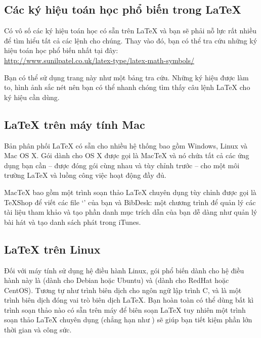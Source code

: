 \subsection{Các ký hiệu toán học phổ biến trong \LaTeX{}}

Có vô số các ký hiệu toán học có sẵn trên \LaTeX{} và bạn sẽ phải nỗ lực rất nhiều để tìm hiểu tất cả các lệnh cho chúng. Thay vào đó, bạn có thể tra cứu những ký hiệu toán học phổ biến nhất tại đây:\\
\url{http://www.sunilpatel.co.uk/latex-type/latex-math-symbols/}

Bạn có thể sử dụng trang này như một bảng tra cứu. Những ký hiệu được làm to, hình ảnh sắc nét nên bạn có thể nhanh chóng tìm thấy câu lệnh \LaTeX{} cho ký hiệu cần dùng.


\subsection{\LaTeX{} trên máy tính Mac}

Bản phân phối \LaTeX{} có sẵn cho nhiều hệ thống bao gồm Windows, Linux và Mac OS X. Gói dành cho OS X được gọi là MacTeX và nó chứa tất cả các ứng dụng bạn cần -- được đóng gói cùng nhau và tùy chỉnh trước -- cho một môi trường \LaTeX{} và luồng công việc hoạt động đầy đủ.

MacTeX bao gồm một trình soạn thảo \LaTeX{} chuyên dụng tùy chỉnh được gọi là TeXShop để viết các file `' của bạn và BibDesk: một chương trình để quản lý các tài liệu tham khảo và tạo phần danh mục trích dẫn của bạn dễ dàng như quản lý bài hát và tạo danh sách phát trong iTunes.


\subsection{\LaTeX{} trên Linux}
Đối với máy tính sử dụng hệ điều hành Linux, gói phổ biến dành cho hệ điều hành này là  (dành cho Debian hoặc Ubuntu) và  (dành cho RedHat hoặc CentOS). Tương tự như trình biên dịch  cho ngôn ngữ lập trình C,  và  là một trình biên dịch đóng vai trò biên dịch \LaTeX{}. Bạn hoàn toàn có thể dùng bất kì trình soạn thảo nào có sẵn trên máy để biên soạn \LaTeX{} tuy nhiên một trình soạn thảo \LaTeX{} chuyên dụng (chẳng hạn như \href{https://www.texstudio.org}{}) sẽ giúp bạn tiết kiệm phần lớn thời gian và công sức.



